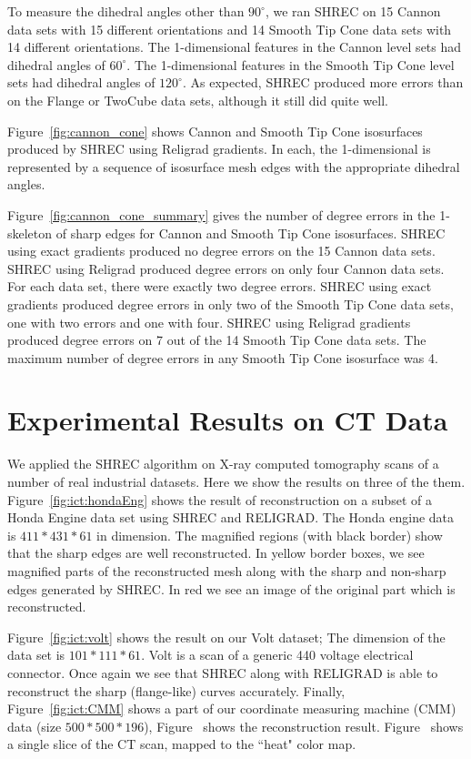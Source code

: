 To measure the dihedral angles other than $90^\circ$,
we ran SHREC on 15 Cannon data sets with 15 different orientations
and 14 Smooth Tip Cone data sets with 14 different orientations.
The 1-dimensional features in the Cannon level sets
had dihedral angles of $60^\circ$.
The 1-dimensional features in the Smooth Tip Cone level sets
had dihedral angles of $120^\circ$.
As expected, SHREC produced more errors than on the Flange or TwoCube
data sets, although it still did quite well.

Figure~\ref{fig:cannon_cone} shows Cannon and Smooth Tip Cone isosurfaces
produced by SHREC using Religrad gradients.
In each, the 1-dimensional is represented by a sequence 
of isosurface mesh edges with the appropriate dihedral angles.

Figure~\ref{fig:cannon_cone_summary} gives the number of degree errors
in the 1-skeleton of sharp edges
for Cannon and Smooth Tip Cone isosurfaces.
SHREC using exact gradients produced no degree errors 
on the 15 Cannon data sets.
SHREC using Religrad produced degree errors on only four Cannon data sets.
For each data set, there were exactly two degree errors.
SHREC using exact gradients produced degree errors in only two 
of the Smooth Tip Cone data sets,
one with two errors and one with four.
SHREC using Religrad gradients produced degree errors on 7 out of the 14
Smooth Tip Cone data sets.
The maximum number of degree errors in any Smooth Tip Cone isosurface
was 4.


\section{Experimental Results on CT Data}
We applied the SHREC algorithm on X-ray computed tomography scans of a number of real industrial datasets. Here we show the results on three of the them. 
Figure~\ref{fig:ict:hondaEng} shows the result of reconstruction on a subset of a Honda Engine data set using SHREC and RELIGRAD. The Honda engine data is $411*431*61$ in dimension. The magnified regions (with black border) show that the sharp edges are well reconstructed. In yellow border boxes, we see magnified parts of the  reconstructed mesh along with the sharp and non-sharp edges generated by SHREC. In red we see an image of the original part which is reconstructed. 


Figure~\ref{fig:ict:volt} shows the result on our Volt dataset; The dimension of the data set is $101*111*61$. Volt is a scan of a generic 440 voltage electrical connector. Once again we see that SHREC along with RELIGRAD is able to reconstruct the sharp (flange-like) curves accurately. Finally, Figure~\ref{fig:ict:CMM} shows a part of our coordinate measuring machine (CMM) data (size $500*500*196$), Figure~\protect{} shows the reconstruction result. Figure~\protect{} shows a single slice of the CT scan, mapped to the ``heat" color map. 

